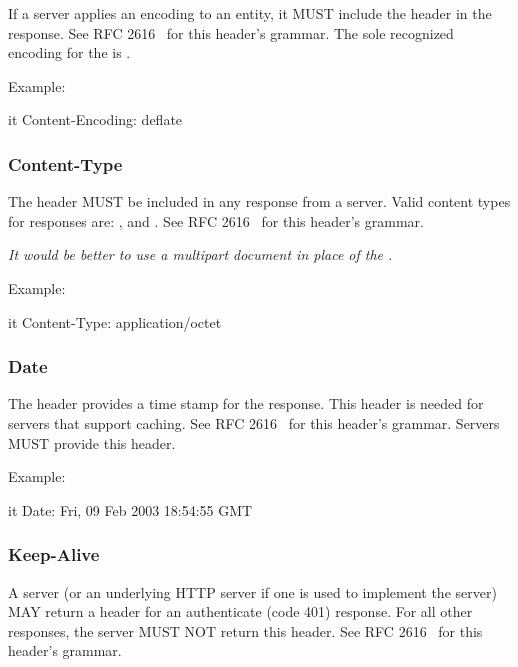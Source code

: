 \documentclass[justify]{dods-paper}
\begin{document}
If a \DAP server applies an encoding to an entity, it MUST include the
 header in the response. See RFC
2616~\cite{rfc2616} for this header's grammar. The sole recognized
encoding for the \DAP is .

Example:

\begin{vcode}{it}
Content-Encoding: deflate
\end{vcode}

\subsubsection{Content-Type}

The  header MUST be included in any response from a
\DAP server. Valid content types for \DAP responses are:
,  and .  See
RFC 2616~\cite{rfc2616} for this header's grammar.

\emph{It would be better to use a multipart
  document in place of the .} 

Example:

\begin{vcode}{it}
Content-Type: application/octet
\end{vcode}

\subsubsection{Date}

The  header provides a time stamp for the response. This header
is needed for servers that support caching. See RFC 2616~\cite{rfc2616}
for this header's grammar. Servers MUST provide this header.

Example:

\begin{vcode}{it}
Date: Fri, 09 Feb 2003 18:54:55 GMT
\end{vcode}

\subsubsection{Keep-Alive}

A \DAP server (or an underlying HTTP server if one is used to
implement the \DAP server) MAY return a  header for an
authenticate (code 401) response. For all other responses, the \DAP
server MUST NOT return this header. See
RFC 2616~\cite{rfc2616} for this header's grammar.
\end{document}
